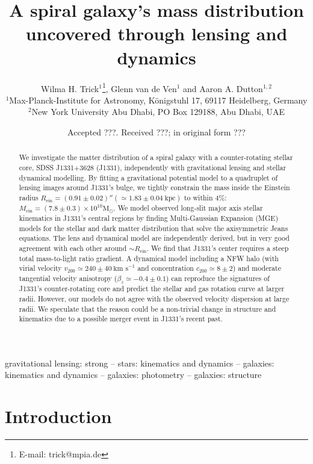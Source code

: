 \documentclass[useAMS,usenatbib]{mnras}
\title[A spiral galaxy's mass distribution uncovered]{A spiral galaxy's mass distribution uncovered through lensing and dynamics}
\author[W.H. Trick, G. van de Ven and A.A. Dutton]{Wilma H. Trick$^{1}$\thanks{E-mail: trick@mpia.de}, Glenn van de Ven$^{1}$ and Aaron A. Dutton$^{1,2}$\\
$^{1}$Max-Planck-Institute for Astronomy, K\"{o}nigstuhl 17, 69117 Heidelberg, Germany\\
$^{2}$New York University Abu Dhabi, PO Box 129188, Abu Dhabi, UAE\\}
\begin{document}
\date{Accepted ???. Received ???; in original form ???}

\pagerange{\pageref{firstpage}--\pageref{lastpage}} 

\maketitle

\label{firstpage}

\begin{abstract}
We investigate the matter distribution of a spiral galaxy with a counter-rotating stellar core, SDSS J1331+3628 (J1331), independently with gravitational lensing and stellar dynamical modelling. By fitting a gravitational potential model to a quadruplet of lensing images around J1331's bulge, we tightly constrain the mass inside the Einstein radius $R_\text{ein}=(0.91\pm0.02)''(\simeq1.83\pm0.04~\text{kpc})$ to within 4\%: $M_\text{ein} = (7.8\pm0.3) \times 10^{10} \text{M}_\odot$. We model observed long-slit major axis stellar kinematics in J1331's central regions by finding Multi-Gaussian Expansion (MGE) models for the stellar and dark matter distribution that solve the axisymmetric Jeans equations. The lens and dynamical model are independently derived, but in very good agreement with each other around $\sim R_\text{ein}$. We find that J1331's center requires a steep total mass-to-light ratio gradient. A dynamical model including a NFW halo (with virial velocity $v_{200} \simeq 240 \pm 40~\text{km s}^{-1}$ and concentration $c_{200} \simeq 8 \pm 2$) and moderate tangential velocity anisotropy ($\beta_z \simeq -0.4 \pm 0.1$) can reproduce the signatures of J1331's counter-rotating core and predict the stellar and gas rotation curve at larger radii. However, our models do not agree with the observed velocity dispersion at large radii. We speculate that the reason could be a non-trivial change in structure and kinematics due to a possible merger event in J1331's recent past.
\end{abstract}

\begin{keywords}
gravitational lensing: strong -- stars: kinematics and dynamics -- galaxies: kinematics and dynamics -- galaxies: photometry -- galaxies: structure
\end{keywords}

\section{Introduction} \label{sec:intro}
\end{document}
